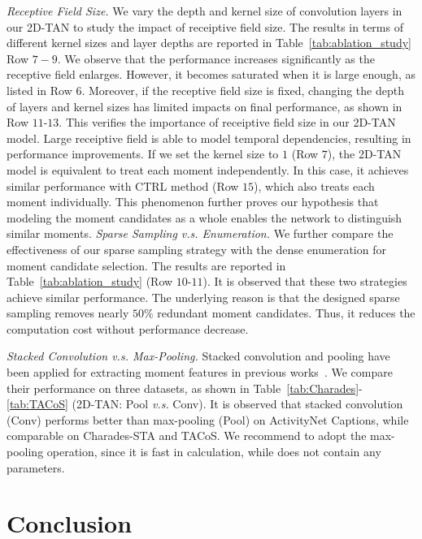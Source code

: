 \documentclass[letterpaper]{article} %
\begin{document}
\textit{Receptive Field Size. } We vary the depth and kernel size of convolution layers in our 2D-TAN to study the impact of receiptive field size.
The results in terms of different kernel sizes and layer depths are reported in Table~\ref{tab:ablation_study} Row $7-9$.
We observe that the performance increases significantly as the receptive field enlarges.
However, it becomes saturated when it is large enough, as listed in Row $6$.
Moreover, if the receptive field size is fixed, changing the depth of layers and kernel sizes has limited impacts on final performance, as shown in Row $11$-$13$.
This verifies the importance of receiptive field size in our 2D-TAN model. Large receiptive field is able to model temporal dependencies, resulting in performance improvements.
If we set the kernel size to $1$ (Row $7$), the 2D-TAN model is equivalent to treat each moment independently. In this case, it achieves similar performance with CTRL method (Row $15$), which also treats each moment individually.
This phenomenon further proves our hypothesis that modeling the moment candidates as a whole enables the network to distinguish similar moments.  \textit{Sparse Sampling \emph{v.s.} Enumeration.}
We further compare the effectiveness of our sparse sampling strategy with the dense enumeration for moment candidate selection. The results are reported in Table~\ref{tab:ablation_study} (Row $10$-$11$). It is observed that these two strategies achieve similar performance. The underlying reason is that the designed sparse sampling removes nearly $50\%$ redundant moment candidates. Thus, it reduces the computation cost without performance decrease.

\textit{Stacked Convolution \emph{v.s.} Max-Pooling.}
Stacked convolution and pooling have been applied for extracting moment features in previous works~\cite{hendricks17iccv,zhang2019man}.
We compare their performance on three datasets, as  shown in Table~\ref{tab:Charades}-\ref{tab:TACoS} (2D-TAN: Pool \emph{v.s.} Conv).
It is observed that stacked convolution (Conv) performs better than max-pooling (Pool) on ActivityNet Captions, while comparable on Charades-STA and TACoS. We recommend to adopt the max-pooling operation, since it is fast in calculation, while does not contain any parameters.

\vspace{-3.23mm}
\section{Conclusion}
\end{document}
